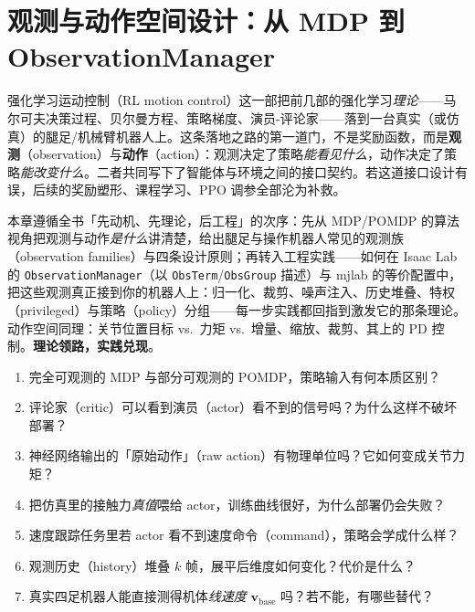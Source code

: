 \chapter{观测与动作空间设计：从 MDP 到 ObservationManager}\label{ch:rlmc-obsact}


强化学习运动控制（RL motion control）这一部把前几部的强化学习\emph{理论}——马尔可夫决策过程、贝尔曼方程、策略梯度、演员-评论家——落到一台真实（或仿真）的腿足/机械臂机器人上。这条落地之路的第一道门，不是奖励函数，而是\textbf{观测}（observation）与\textbf{动作}（action）：观测决定了策略\emph{能看见什么}，动作决定了策略\emph{能改变什么}。二者共同写下了智能体与环境之间的接口契约。若这道接口设计有误，后续的奖励塑形、课程学习、PPO 调参全部沦为补救。

本章遵循全书「先动机、先理论，后工程」的次序：先从 MDP/POMDP 的算法视角把观测与动作\emph{是什么}讲清楚，给出腿足与操作机器人常见的观测族（observation families）与四条设计原则；再转入工程实践——如何在 Isaac Lab 的 \verb|ObservationManager|（以 \verb|ObsTerm|/\verb|ObsGroup| 描述）与 mjlab 的等价配置中，把这些观测真正接到你的机器人上：归一化、裁剪、噪声注入、历史堆叠、特权（privileged）与策略（policy）分组——每一步实践都回指到激发它的那条理论。动作空间同理：关节位置目标 vs.\ 力矩 vs.\ 增量、缩放、裁剪、其上的 PD 控制。\textbf{理论领路，实践兑现}。

\begin{practice}
\begin{enumerate}
  \item 完全可观测的 MDP 与部分可观测的 POMDP，策略输入有何本质区别？
  \item 评论家（critic）可以看到演员（actor）看不到的信号吗？为什么这样不破坏部署？
  \item 神经网络输出的「原始动作」（raw action）有物理单位吗？它如何变成关节力矩？
  \item 把仿真里的接触力\emph{真值}喂给 actor，训练曲线很好，为什么部署仍会失败？
  \item 速度跟踪任务里若 actor 看不到速度命令（command），策略会学成什么样？
  \item 观测历史（history）堆叠 $k$ 帧，展平后维度如何变化？代价是什么？
  \item 真实四足机器人能直接测得机体\emph{线速度} $\mathbf v_{\text{base}}$ 吗？若不能，有哪些替代？
\end{enumerate}
\end{practice}

